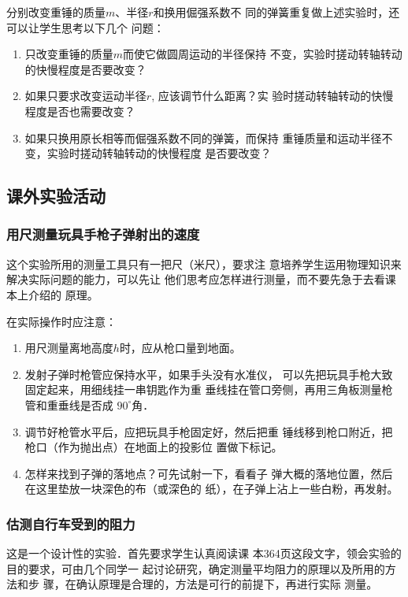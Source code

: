 分别改变重锤的质量$m$、半径$r$和换用倔强系数不
同的弹簧重复做上述实验时，还可以让学生思考以下几个
问题：
\begin{enumerate}
\item 只改变重锤的质量$m$而使它做圆周运动的半径保持
不变，实验时搓动转轴转动的快慢程度是否要改变？
\item 如果只要求改变运动半径$r$, 应该调节什么距离？实
验时搓动转轴转动的快慢程度是否也需要改变？
\item 如果只换用原长相等而倔强系数不同的弹簧，而保持
重锤质量和运动半径不变，实验时搓动转轴转动的快慢程度
是否要改变？
\end{enumerate}

\subsection{课外实验活动}

\subsubsection{用尺测量玩具手枪子弹射出的速度}

这个实验所用的测量工具只有一把尺（米尺），要求注
意培养学生运用物理知识来解决实际问题的能力，可以先让
他们思考应怎样进行测量，而不要先急于去看课本上介绍的
原理。

在实际操作时应注意：
\begin{enumerate}
\item 用尺测量离地高度$h$时，应从枪口量到地面。
\item 发射子弹时枪管应保持水平，如果手头没有水准仪，
可以先把玩具手枪大致固定起来，用细线挂一串钥匙作为重
垂线挂在管口旁侧，再用三角板测量枪管和重垂线是否成
$90^{\circ}$角．
\item 调节好枪管水平后，应把玩具手枪固定好，然后把重
锤线移到枪口附近，把枪口（作为抛出点）在地面上的投影位
置做下标记。
\item 怎样来找到子弹的落地点？可先试射一下，看看子
弹大概的落地位置，然后在这里垫放一块深色的布（或深色的
纸），在子弹上沾上一些白粉，再发射。
\end{enumerate}

\subsubsection{估测自行车受到的阻力}
这是一个设计性的实验．首先要求学生认真阅读课
本364页这段文字，领会实验的目的要求，可由几个同学一
起讨论研究，确定测量平均阻力的原理以及所用的方法和步
骤，在确认原理是合理的，方法是可行的前提下，再进行实际
测量。

